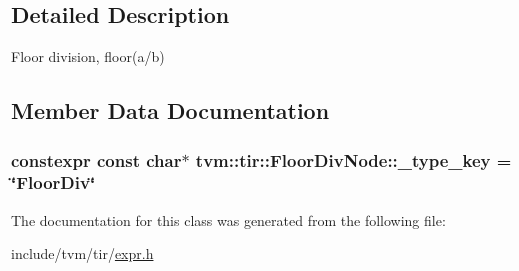 \subsection{Detailed Description}
Floor division, floor(a/b) 

\subsection{Member Data Documentation}
\subsubsection[{\texorpdfstring{\+\_\+type\+\_\+key}{_type_key}}]{\setlength{\rightskip}{0pt plus 5cm}constexpr const char$\ast$ tvm\+::tir\+::\+Floor\+Div\+Node\+::\+\_\+type\+\_\+key = \char`\"{}Floor\+Div\char`\"{}\hspace{0.3cm}{\ttfamily [static]}}\hypertarget{classtvm_1_1tir_1_1FloorDivNode_a6628963b9442d219dcbb5329682cfe7b}{}\label{classtvm_1_1tir_1_1FloorDivNode_a6628963b9442d219dcbb5329682cfe7b}


The documentation for this class was generated from the following file\+:\begin{DoxyCompactItemize}
\item 
include/tvm/tir/\hyperlink{tir_2expr_8h}{expr.\+h}\end{DoxyCompactItemize}
